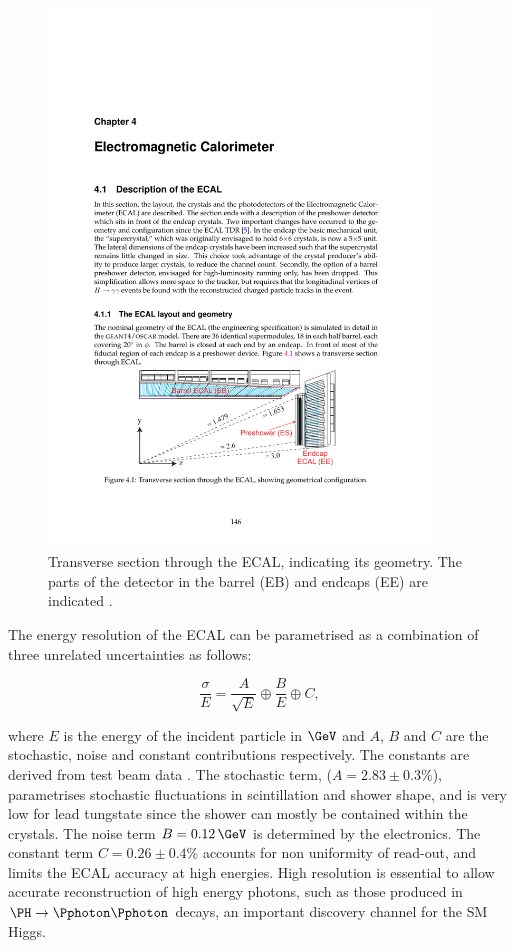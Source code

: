 \begin{figure}[htbp]
   \includegraphics[width=0.9\textwidth]{plots/detector/ecal_layout.pdf}
\caption[Transverse section through the ECAL, indicating its geometry.]
{Transverse section through the \ac{ECAL}, indicating its geometry. The
parts of the detector in the barrel (EB) and endcaps (EE) are indicated
\cite{TDR}.}
\label{fig:ecal}
\end{figure}

The energy resolution of the \ac{ECAL} can be parametrised as a combination of
three unrelated uncertainties as follows:

\begin{equation}
\frac{\sigma}{E} = \frac{A}{\sqrt{E}} \oplus \frac{B}{E} \oplus C , 
\end{equation}

where $E$ is the energy of the incident particle in $\GeV$ and $A$, $B$ and $C$ are the
stochastic, noise and constant contributions respectively. The constants are
derived from test beam data \cite{Chatrchyan:2008aa}. The stochastic term, ($A=2.83\pm0.3\%$),
parametrises stochastic fluctuations in scintillation and shower shape, and is
very low for lead tungstate since the shower can mostly be contained within the
crystals. The noise term $B=0.12\,\GeV$ is determined by the electronics. The
constant term $C=0.26\pm0.4\%$ accounts for non uniformity of read-out, 
and limits the \ac{ECAL} accuracy at high energies.
High resolution is essential to allow accurate reconstruction of high energy
photons, such as those produced in $\PH\to\Pphoton\Pphoton$ decays, an important
discovery channel for the \ac{SM} Higgs.

